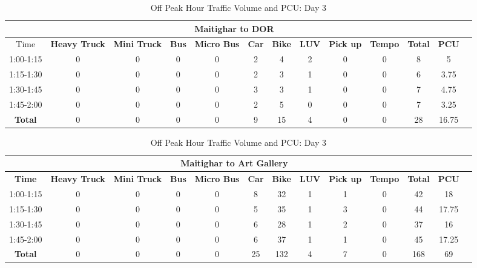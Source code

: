 \begin{landscape}
\centering
\begin{table}[h!]
\centering
\caption{Off Peak Hour Traffic Volume and PCU: Day 3}
\begin{tabular}{|c|c|c|c|c|c|c|c|c|c|c|c|c|}
    \hline
    \multicolumn{12}{|c|}{\textbf{Maitighar to DOR}} \\
    \hline
        Time & \textbf{Heavy Truck} & \textbf{Mini Truck} & \textbf{Bus} & \textbf{Micro Bus} & \textbf{Car} & \textbf{Bike} & \textbf{LUV} & \textbf{Pick up} & \textbf{Tempo} & \textbf{\textbf{Total}} & \textbf{PCU} \\
    \hline
1:00-1:15	&0	&0	&0	&0	&2	&4	&2	&0	&0	&8	&5 \\ \hline
1:15-1:30	&0	&0	&0	&0	&2	&3	&1	&0	&0	&6	&3.75 \\ \hline
1:30-1:45	&0	&0	&0	&0	&3	&3	&1	&0	&0	&7	&4.75 \\ \hline
1:45-2:00	&0	&0	&0	&0	&2	&5	&0	&0	&0	&7	&3.25 \\ \hline
\textbf{Total}	&0	&0	&0	&0	&9	&15	&4	&0	&0	&28 & 16.75 \\ \hline


\end{tabular}

\vspace{0.5cm}

\begin{tabular}{|c|c|c|c|c|c|c|c|c|c|c|c|c|}
    \hline
    \multicolumn{12}{|c|}{\textbf{Maitighar to Art Gallery}} \\
    \hline
    \textbf{Time} & \textbf{Heavy Truck} & \textbf{Mini Truck} & \textbf{Bus} & \textbf{Micro Bus} & \textbf{Car} & \textbf{Bike} & \textbf{LUV} & \textbf{Pick up} & \textbf{Tempo} & \textbf{\textbf{Total}} & \textbf{PCU} \\
    \hline
1:00-1:15	&0	&0	&0	&0	&8	&32	&1	&1	&0	&42	&18 \\ \hline
1:15-1:30	&0	&0	&0	&0	&5	&35	&1	&3	&0	&44	&17.75 \\ \hline
1:30-1:45	&0	&0	&0	&0	&6	&28	&1	&2	&0	&37	&16 \\ \hline
1:45-2:00	&0	&0	&0	&0	&6	&37	&1	&1	&0	&45	&17.25 \\ \hline
\textbf{Total}	&0	&0	&0  &0	& 25 & 132 & 4 & 7 & 0 & 168 & 69 \\ \hline


\end{tabular}
\end{table}
\end{landscape}

